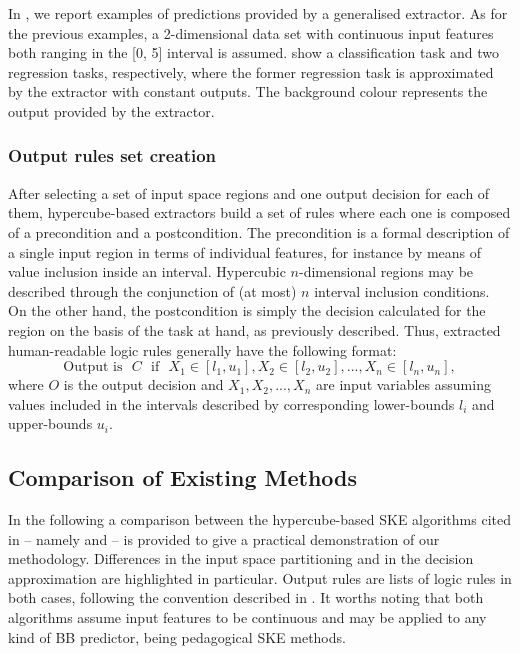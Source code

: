 \documentclass[
]{ceurart}
\begin{document}


In , we report examples of predictions provided by a generalised extractor.
%
As for the previous examples, a 2-dimensional data set with continuous input features both ranging in the [0, 5] interval is assumed.
%
 show a classification task and two regression tasks, respectively, where the former regression task is approximated by the extractor with constant outputs.
%
The background colour represents the output provided by the extractor.

\subsubsection{Output rules set creation}\label{ssec:rule}

After selecting a set of input space regions and one output decision for each of them, hypercube-based extractors build a set of rules where each one is composed of a precondition and a postcondition.
%
The precondition is a formal description of a single input region in terms of individual features, for instance by means of value inclusion inside an interval.
%
Hypercubic $n$-dimensional regions may be described through the conjunction of (at most) $n$ interval inclusion conditions.
%
On the other hand, the postcondition is simply the decision calculated for the region on the basis of the task at hand, as previously described.
%
Thus, extracted human-readable logic rules generally have the following format:
%
\begin{equation*}
	\text{Output is ~} C \text{~ if ~} X_1 \in [l_1, u_1], X_2 \in [l_2, u_2], ..., X_n \in [l_n, u_n],
\end{equation*}
%
where $O$ is the output decision and $X_1, X_2, ..., X_n$ are input variables assuming values included in the intervals described by corresponding lower-bounds $l_i$ and upper-bounds $u_i$.

\subsection{Comparison of Existing Methods}

In the following a comparison between the hypercube-based SKE algorithms cited in  -- namely \iter{} and \gridex{} -- is provided to give a practical demonstration of our methodology.
%
Differences in the input space partitioning and in the decision approximation are highlighted in particular.
%
Output rules are lists of logic rules in both cases, following the convention described in .
%
It worths noting that both algorithms assume input features to be continuous and may be applied to any kind of BB predictor, being pedagogical SKE methods.
\end{document}
